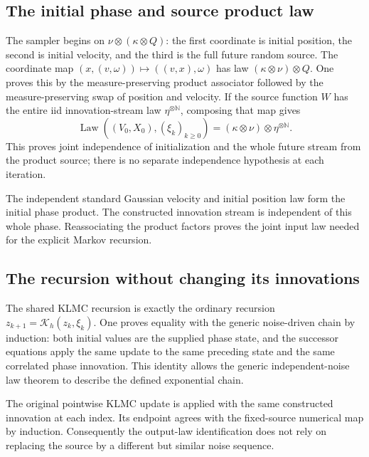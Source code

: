 \documentclass[11pt,a4paper]{report}
\begin{document}
\subsection{\texorpdfstring{The initial phase and source product law}{The initial phase and source product law}}
\label{report-step-KineticLangevin-ProductMarkovLaw-lean-1}


The sampler begins on \(\nu\otimes(\kappa\otimes Q)\): the first coordinate is initial position, the second is initial velocity, and the third is the full future random source. The coordinate map \((x,(v,\omega))\mapsto((v,x),\omega)\) has law \((\kappa\otimes\nu)\otimes Q\). One proves this by the measure-preserving product associator followed by the measure-preserving swap of position and velocity. If the source function \(W\) has the entire iid innovation-stream law \(\eta^{\otimes\mathbb N}\), composing that map gives \[\operatorname{Law}((V_0,X_0),(\xi_k)_{k\ge0})=(\kappa\otimes\nu)\otimes\eta^{\otimes\mathbb N}.\] This proves joint independence of initialization and the whole future stream from the product source; there is no separate independence hypothesis at each iteration.



The independent standard Gaussian velocity and initial position law form the initial phase product. The constructed innovation stream is independent of this whole phase. Reassociating the product factors proves the joint input law needed for the explicit Markov recursion.

\subsection{\texorpdfstring{The recursion without changing its innovations}{The recursion without changing its innovations}}
\label{report-step-KineticLangevin-ProductMarkovLaw-lean-2}


The shared KLMC recursion is exactly the ordinary recursion \(z_{k+1}=\mathcal K_h(z_k,\xi_k)\). One proves equality with the generic noise-driven chain by induction: both initial values are the supplied phase state, and the successor equations apply the same update to the same preceding state and the same correlated phase innovation. This identity allows the generic independent-noise law theorem to describe the defined exponential chain.



The original pointwise KLMC update is applied with the same constructed innovation at each index. Its endpoint agrees with the fixed-source numerical map by induction. Consequently the output-law identification does not rely on replacing the source by a different but similar noise sequence.
\end{document}
